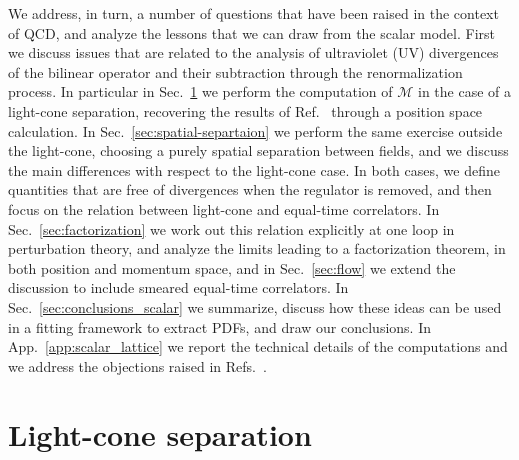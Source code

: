 We address, in turn, a number of questions that have been raised in the context of
QCD, and analyze the lessons that we can draw from the scalar model. 
First we discuss issues that are related to the analysis of ultraviolet (UV)
divergences of the bilinear operator and their subtraction through the
renormalization process. In particular in Sec.~\ref{sec:light-cone} we perform
the computation of $\mathcal{M}$ in the case of a light-cone separation,
recovering the results of Ref.~\cite{Collins:1980ui} through a position space
calculation. In Sec.~\ref{sec:spatial-separtaion} we perform the same exercise
outside the light-cone, choosing a purely spatial separation between fields, and
we discuss the main differences with respect to the light-cone case.
In both cases, we define quantities that are free of divergences when the
regulator is removed, and then focus on the relation between light-cone and
equal-time correlators. In Sec.~\ref{sec:factorization} we work out this
relation explicitly at one loop in perturbation theory, and analyze the limits
leading to a factorization theorem, in both position and momentum space, and
in Sec.~\ref{sec:flow} we extend the discussion to include smeared equal-time correlators.  
In Sec.~\ref{sec:conclusions_scalar} we summarize, discuss how these ideas can be used
in a fitting framework to extract PDFs, and draw our conclusions. In App.~\ref{app:scalar_lattice}
we report the technical details of the
computations and we address the objections raised in
Refs.~\cite{Rossi:2017muf,Rossi:2018zkn}.


\section{Light-cone separation}
\label{sec:light-cone}

